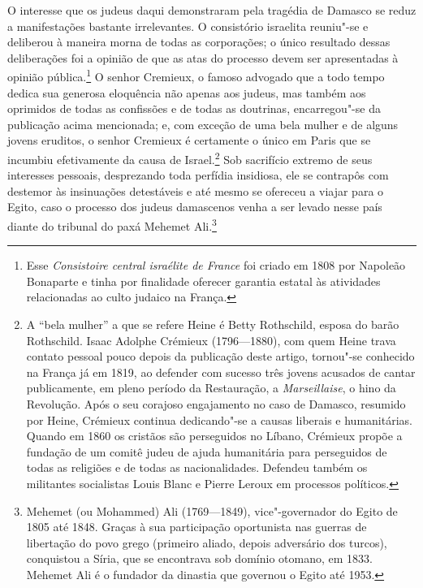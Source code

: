  O interesse que os judeus daqui demonstraram pela tragédia de Damasco
se reduz a manifestações bastante irrelevantes. O consistório
israelita reuniu"-se e deliberou à maneira morna de todas as
corporações; o único resultado dessas deliberações foi a opinião de que
as atas do processo devem ser apresentadas à opinião pública.\footnote{
Esse \textit{Consistoire central israélite de France}
foi criado em 1808 por Napoleão Bonaparte e tinha por finalidade
oferecer garantia estatal às atividades relacionadas ao culto judaico
na França. } O senhor Cremieux, o famoso advogado que a todo tempo
dedica sua generosa eloquência não apenas aos judeus, mas também aos
oprimidos de todas as confissões e de todas as doutrinas,
encarregou"-se da publicação acima mencionada; e, com exceção de uma
bela mulher e de alguns jovens eruditos, o senhor Cremieux é certamente
o único em Paris que se incumbiu efetivamente da causa de
Israel.\footnote{ A “bela mulher” a que se refere Heine é Betty
Rothschild, esposa do barão Rothschild. Isaac Adolphe Crémieux
(1796---1880), com quem Heine trava contato pessoal pouco depois da
publicação deste artigo, tornou"-se conhecido na França já em 1819, ao
defender com sucesso três jovens acusados de cantar publicamente, em
pleno período da Restauração, a \textit{Marseillaise}, o hino da
Revolução. Após o seu corajoso engajamento no caso de Damasco, resumido
por Heine, Crémieux continua dedicando"-se a causas liberais e
humanitárias. Quando em 1860 os cristãos são perseguidos no Líbano,
Crémieux propõe a fundação de um comitê judeu de ajuda humanitária para
perseguidos de todas as religiões e de todas as nacionalidades.
Defendeu também os militantes socialistas Louis Blanc e Pierre Leroux
em processos políticos.} Sob sacrifício extremo de seus interesses
pessoais, desprezando toda perfídia insidiosa, ele se contrapôs com
destemor às insinuações detestáveis e até mesmo se ofereceu a viajar
para o Egito, caso o processo dos judeus damascenos venha a ser levado
nesse país diante do tribunal do paxá Mehemet Ali.\footnote{ Mehemet
(ou Mohammed) Ali (1769---1849), vice"-governador do Egito de 1805 até
1848. Graças à sua participação oportunista nas guerras de libertação
do povo grego (primeiro aliado, depois adversário dos turcos),
conquistou a Síria, que se encontrava sob domínio otomano, em 1833.
Mehemet Ali é o fundador da dinastia que governou o Egito até 1953.}

